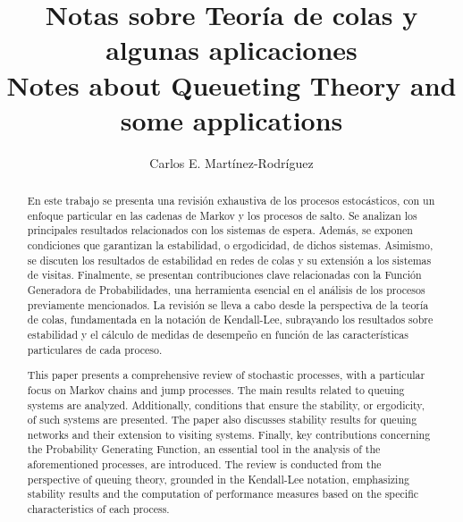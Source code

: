 \documentclass{article}
\title{Notas sobre Teor\'ia de colas y algunas aplicaciones\\
\small{Notes about Queueting Theory and some applications}}
\author{Carlos E. Martínez-Rodríguez}
\date{}
\renewcommand{\abstractname}{Resumen}
\numberwithin{equation}{section}
\newcommand{\acmclass}[1]{\noindent\textbf{ACM Class:} #1\\}
\newcommand{\mscclass}[1]{\noindent\textbf{MSC Class:} #1\\}
\begin{document}
\maketitle

\begin{abstract}
En este trabajo se presenta una revisión exhaustiva de los procesos estocásticos, con un enfoque particular en las cadenas de Markov y los procesos de salto. Se analizan los principales resultados relacionados con los sistemas de espera. Además, se exponen condiciones que garantizan la estabilidad, o ergodicidad, de dichos sistemas. Asimismo, se discuten los resultados de estabilidad en redes de colas y su extensión a los sistemas de visitas. Finalmente, se presentan contribuciones clave relacionadas con la Función Generadora de Probabilidades, una herramienta esencial en el análisis de los procesos previamente mencionados. La revisión se lleva a cabo desde la perspectiva de la teoría de colas, fundamentada en la notación de Kendall-Lee, subrayando los resultados sobre estabilidad y el cálculo de medidas de desempeño en función de las características particulares de cada proceso.

\end{abstract}

\begin{otherlanguage}{english}
\renewcommand{\abstractname}{Abstract} %
\begin{abstract}
This paper presents a comprehensive review of stochastic processes, with a particular focus on Markov chains and jump processes. The main results related to queuing systems are analyzed. Additionally, conditions that ensure the stability, or ergodicity, of such systems are presented. The paper also discusses stability results for queuing networks and their extension to visiting systems. Finally, key contributions concerning the Probability Generating Function, an essential tool in the analysis of the aforementioned processes, are introduced. The review is conducted from the perspective of queuing theory, grounded in the Kendall-Lee notation, emphasizing stability results and the computation of performance measures based on the specific characteristics of each process.
\end{abstract}
\end{otherlanguage}
\end{document}
